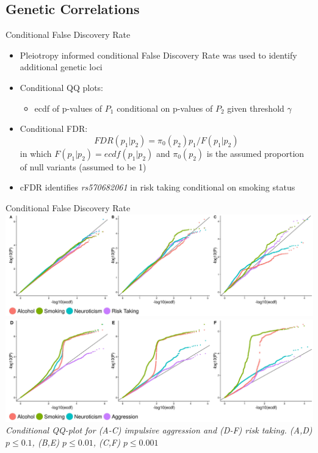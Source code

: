 \documentclass{beamer}
\begin{document}
\subsection{Genetic Correlations}

\begin{frame}[t]{Conditional False Discovery Rate}
  \small
  \begin{itemize}
    \item Pleiotropy informed conditional False Discovery Rate was used to identify additional genetic loci
    \item Conditional QQ plots: 
      \begin{itemize}
        \small
        \item ecdf of p-values of $P_1$ conditional on p-values of $P_2$ given threshold $\gamma$
      \end{itemize}
    \item Conditional FDR:\\
      \begin{equation}
        FDR(p_1|p_2)=\pi_0(p_2)p_1/F(p_1|p_2)
      \end{equation}
      in which $F(p_1|p_2) =  ecdf(p_1|p_2)$ and $\pi_0(p_2)$ is the assumed proportion of null variants (assumed to be 1) 
    \item cFDR identifies \textit{rs570682061} in risk taking conditional on smoking status
  \end{itemize}
\end{frame}
\begin{frame}[t]{Conditional False Discovery Rate}
  \tiny
  \includegraphics[width=1\linewidth]{../ukb_assoc/figure/cFDR/agg_cond.jpeg} \\
  \includegraphics[width=1\linewidth]{../ukb_assoc/figure/cFDR/risk_cond.jpeg}
  \vfill
  {\centering \textit{Conditional QQ-plot for (A-C) impulsive aggression and (D-F) risk taking. (A,D) $p\leq0.1$, (B,E) $p\leq0.01$, (C,F) $p\leq0.001$}}
\end{frame}
\end{document}
